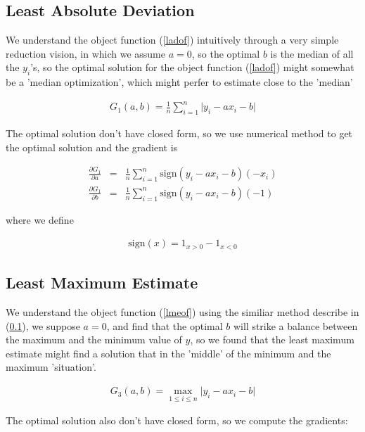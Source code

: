 \documentclass[twoside]{article}
\begin{document}
\subsection{Least Absolute Deviation}
\label{lad}

We understand the object function (\ref{ladof}) intuitively through a very simple reduction vision, in which we assume $a=0$, so the optimal $b$ is the median of all the $y_i$'s, so the optimal solution for the object function (\ref{ladof}) might somewhat be a 'median optimization', which might perfer to estimate close to the 'median'

\begin{eqnarray}
\label{ladof}
  G_1(a,b)=\frac{1}{n}\sum_{i=1}^n{\lvert y_i - a x_i - b\rvert}
\end{eqnarray}

The optimal solution don't have closed form, so we use numerical method to get the optimal solution and the gradient is

\begin{eqnarray}
  \frac{\partial G_1}{\partial a}&=&\frac{1}{n}\sum_{i=1}^n{\mathrm{sign}(y_i-a x_i - b)(-x_i)} \\
  \frac{\partial G_1}{\partial b}&=&\frac{1}{n}\sum_{i=1}^n{\mathrm{sign}(y_i-a x_i - b)(-1)} 
\end{eqnarray}

where we define

\begin{eqnarray}
\mathrm{sign}(x) = 1_{x>0} - 1_{x<0}
\end{eqnarray}

\subsection{Least Maximum Estimate}

We understand the object function (\ref{lmeof}) using the similiar method describe in (\ref{lad}), we suppose $a=0$, and find that the optimal $b$ will strike a balance between the maximum and the minimum value of $y$, so we found that the least maximum estimate might find a solution that in the 'middle' of the minimum and the maximum 'situation'.

\begin{eqnarray}
\label{lmeof}
G_3(a,b)=\max_{1 \le i\le n}{\lvert y_i - a x_i - b\rvert}
\end{eqnarray}

The optimal solution also don't have closed form, so we compute the gradients:
\end{document}
